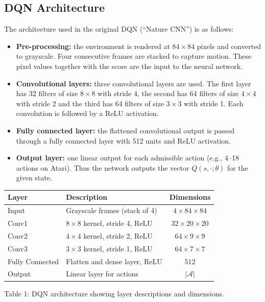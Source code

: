 \documentclass[11pt,a4paper]{article}
\begin{document}
\subsection{DQN Architecture}
The architecture used in the original DQN (``Nature CNN'') is as follows:
\begin{itemize}
 \item \textbf{Pre-processing:} the environment is rendered at $84\times84$
 pixels and converted to grayscale. Four consecutive frames are stacked to
 capture motion. These pixel values together with the score are the input to
 the neural network.
 \item \textbf{Convolutional layers:} three convolutional layers are used.
 The first layer has 32 filters of size $8\times8$ with stride 4, the second
 has 64 filters of size $4\times4$ with stride 2 and the third has 64 filters
 of size $3\times3$ with stride 1. Each convolution is followed by a ReLU
 activation.
 \item \textbf{Fully connected layer:} the flattened convolutional output
 is passed through a fully connected layer with 512 units and ReLU activation.
 \item \textbf{Output layer:} one linear output for each admissible action
 (e.g., 4--18 actions on Atari). Thus the network outputs the vector
 $Q(s,\cdot;\theta)$ for the given state.
\end{itemize}
\begin{center}
{\small
\begin{tabularx}{\linewidth}{@{}lXc@{}}
\toprule
\textbf{Layer} & \textbf{Description} & \textbf{Dimensions}\\
\midrule
Input & Grayscale frames (stack of 4) & $4\times84\times84$\\
Conv1 & $8\times8$ kernel, stride 4, ReLU & $32\times20\times20$\\
Conv2 & $4\times4$ kernel, stride 2, ReLU & $64\times9\times9$\\
Conv3 & $3\times3$ kernel, stride 1, ReLU & $64\times7\times7$\\
Fully Connected & Flatten and dense layer, ReLU & $512$\\
Output & Linear layer for actions & $|\mathcal A|$\\
\bottomrule
\end{tabularx}\par}
\smallskip
{\small\color{muted}Table 1: DQN architecture showing layer descriptions and dimensions.}
\end{center}
\endgroup
\end{document}
